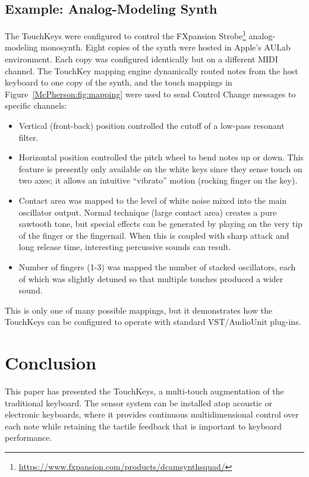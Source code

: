 \subsection{Example: Analog-Modeling Synth}
The TouchKeys were configured to control the FXpansion Strobe\footnote{\url{https://www.fxpansion.com/products/dcamsynthsquad/}} analog-modeling monosynth. Eight copies of the synth were hosted in Apple's AULab environment. Each copy was configured identically but on a different MIDI channel. The TouchKey mapping engine dynamically routed notes from the host keyboard to one copy of the synth, and the touch mappings in Figure~\ref{McPherson:fig:mapping} were used to send Control Change messages to specific channels:
\begin{itemize}
\item{Vertical (front-back) position controlled the cutoff of a low-pass resonant filter.}
\item{Horizontal position controlled the pitch wheel to bend notes up or down. This feature is presently only available on the white keys since they sense touch on two axes; it allows an intuitive ``vibrato'' motion (rocking finger on the key).}
\item{Contact area was mapped to the level of white noise mixed into the main oscillator output. Normal technique (large contact area) creates a pure sawtooth tone, but special effects can be generated by playing on the very tip of the finger or the fingernail. When this is coupled with sharp attack and long release time, interesting percussive sounds can result.}
\item{Number of fingers (1-3) was mapped the number of stacked oscillators, each of which was slightly detuned so that multiple touches produced a wider sound.}
\end{itemize}

This is only one of many possible mappings, but it demonstrates how the TouchKeys can be configured to operate with standard VST/AudioUnit plug-ins.

\section{Conclusion}
This paper has presented the TouchKeys, a multi-touch augmentation of the traditional keyboard. The sensor system can be installed atop acoustic or electronic keyboards, where it provides continuous multidimensional control over each note while retaining the tactile feedback that is important to keyboard performance.

